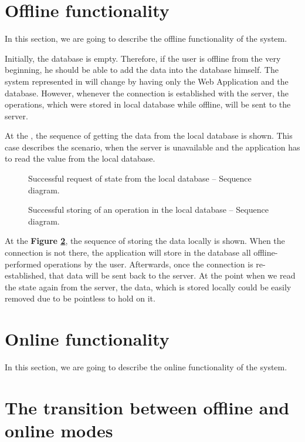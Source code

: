 \section{Offline functionality}

In this section, we are going to describe the offline functionality of the system.

Initially, the database is empty. Therefore, if the user is offline from the very beginning, he should be able to add the data into the database himself. 
The system represented in  will change by having only the Web Application and the database. However, whenever the connection is established with the server, the operations, which were stored in local database while offline, will be sent to the server. 

At the , the sequence of getting the data from the local database is shown. This case describes the scenario, when the server is unavailable and the application has to read the value from the local database. 

\begin{figure}[!htb]
    \begin{center}
    \def\svgwidth{\columnwidth}
    
    \caption {Successful request of state from the local database -- Sequence diagram.}
    \label{fig:design6}
\end{center}
\end{figure}


\begin{figure}[!htb]
    \begin{center}
    \def\svgwidth{\columnwidth}
    
    \caption {Successful storing of an operation in the local database -- Sequence diagram.}
    \label{fig:design7}
\end{center}
\end{figure}

At the \textbf{Figure \ref{fig:design7}}, the sequence of storing the data locally is shown. When the connection is not there, the application will store in the database all offline-performed operations by the user. Afterwards, once the connection is re-established, that data will be sent back to the server. At the point when we read the state again from the server, the data, which is stored locally could be easily removed due to be pointless to hold on it. 


\section {Online functionality}

In this section, we are going to describe the online functionality of the system.



\section {The transition between offline and online modes}